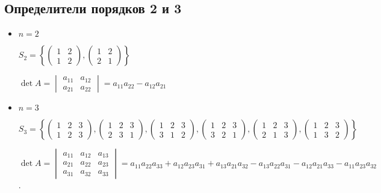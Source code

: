 \subsection{Определители порядков 2 и 3}
\begin{itemize}
\item
    $n = 2$

    $S_2 = \left\{ \begin{pmatrix} 1 & 2 \\ 1 & 2 \end{pmatrix}, \begin{pmatrix} 1 & 2 \\ 2 & 1 \end{pmatrix} \right\}$

    $\det A = \begin{vmatrix} a_{11} & a_{12} \\ a_{21} & a_{22} \end{vmatrix} = a_{11} a_{22} - a_{12} a_{21}$

\item
    $n = 3$

    $S_3 = \left\{
    \begin{pmatrix} 1 & 2 & 3 \\ 1 & 2 & 3 \end{pmatrix},
    \begin{pmatrix} 1 & 2 & 3 \\ 2 & 3 & 1 \end{pmatrix},
    \begin{pmatrix} 1 & 2 & 3 \\ 3 & 1 & 2 \end{pmatrix},
    \begin{pmatrix} 1 & 2 & 3 \\ 3 & 2 & 1 \end{pmatrix},
    \begin{pmatrix} 1 & 2 & 3 \\ 2 & 1 & 3 \end{pmatrix},
    \begin{pmatrix} 1 & 2 & 3 \\ 1 & 3 & 2 \end{pmatrix} \right\}$

    $\det A = \begin{vmatrix} a_{11} & a_{12} & a_{13} \\ a_{21} & a_{22} & a_{23} \\ a_{31} & a_{32} & a_{33} \end{vmatrix} = a_{11} a_{22} a_{33} + a_{12} a_{23} a_{31} + a_{13} a_{21} a_{32} - a_{13} a_{22} a_{31} - a_{12} a_{21} a_{33} - a_{11} a_{23} a_{32}$.
\end{itemize}
